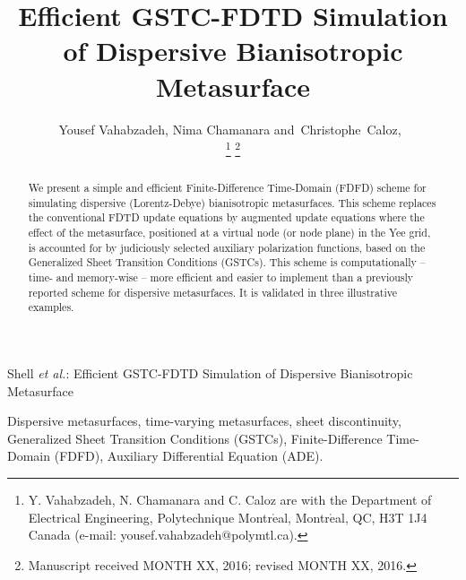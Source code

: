 \documentclass[journal]{IEEEtran}
\begin{document}
\title{Efficient GSTC-FDTD Simulation \\ of Dispersive Bianisotropic Metasurface}
\author{Yousef Vahabzadeh, Nima Chamanara
        and~Christophe~Caloz,~%

\thanks{Y. Vahabzadeh, N. Chamanara and C. Caloz are with the Department
of Electrical Engineering, Polytechnique Montr$\acute{\mathrm{e}}$al, Montr$\acute{\mathrm{e}}$al,
QC, H3T 1J4 Canada (e-mail: yousef.vahabzadeh@polymtl.ca).}%
\thanks{Manuscript received MONTH XX, 2016; revised MONTH XX, 2016.}}

%
{Shell \MakeLowercase{\textit{et al.}}: Efficient GSTC-FDTD Simulation of Dispersive Bianisotropic Metasurface}

\maketitle


\begin{abstract}
We present a simple and efficient Finite-Difference Time-Domain (FDFD) scheme for simulating dispersive (Lorentz-Debye) bianisotropic metasurfaces. This scheme replaces the conventional FDTD update equations by augmented update equations where the effect of the metasurface, positioned at a virtual node (or node plane) in the Yee grid, is accounted for by judiciously selected auxiliary polarization functions, based on the Generalized Sheet Transition Conditions (GSTCs). This scheme is computationally -- time- and memory-wise -- more efficient and easier to implement than a previously reported scheme for dispersive metasurfaces. It is validated in three illustrative examples.
\end{abstract}

\begin{IEEEkeywords}
Dispersive metasurfaces, time-varying metasurfaces, sheet discontinuity, Generalized Sheet Transition Conditions (GSTCs), Finite-Difference Time-Domain (FDFD), Auxiliary Differential Equation (ADE).
\end{IEEEkeywords}

\IEEEpeerreviewmaketitle
\end{document}
